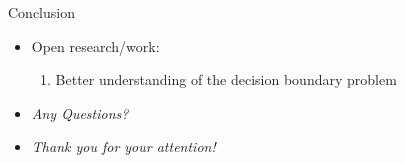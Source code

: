 \documentclass{beamer}
\begin{document}
\begin{frame}{Conclusion}

\begin{itemize}
\item Open research/work:
\begin{enumerate}
\item Better understanding of the decision boundary problem
\end{enumerate}
\item \Large{\textit{Any Questions?}}
\item \Large{\textit{Thank you for your attention!}}
\end{itemize}


\end{frame}


\end{document}
